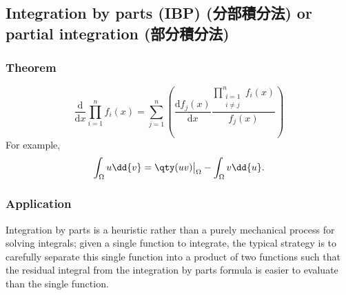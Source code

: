 \documentclass[a4paper,12pt]{report}
\begin{document}
{{{{{{{{{{{{\subsection{Integration by parts (IBP) (分部積分法) or partial integration (部分積分法)}
\subsubsection{Theorem}
\[\frac{\mathrm{d}}{\mathrm{d}x}\prod_{i=1}^nf_i(x)=\sum_{j=1}^n\left(\frac{\mathrm{d}f_j(x)}{\mathrm{d}x}\frac{\prod_{\substack{i=1\\i\neq j}}^n f_i(x)}{f_j(x)}\right)\]
For example,
\[\int_{\Omega} u\dd{v} = \qty(u v)\big\vert_{\Omega} - \int_{\Omega} v\dd{u}.\]
\subsubsection{Application}
Integration by parts is a heuristic rather than a purely mechanical process for solving integrals; given a single function to integrate, the typical strategy is to carefully separate this single function into a product of two functions such that the residual integral from the integration by parts formula is easier to evaluate than the single function.

}}}}}}}}}}}}
\end{document}
